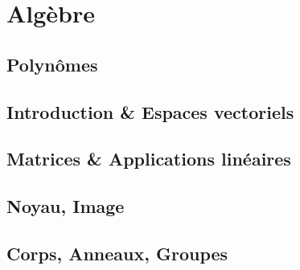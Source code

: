 \section{Algèbre}
\subsection{Polynômes}
\subsection{Introduction \& Espaces vectoriels}
\subsection{Matrices \& Applications linéaires}
\subsection{Noyau, Image}
\subsection{Corps, Anneaux, Groupes}